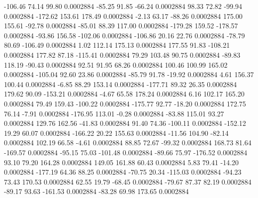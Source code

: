      -106.46       74.14       99.80     0.0002884
      -85.25       91.85      -66.24     0.0002884
       98.33       72.82      -99.94     0.0002884
     -172.62      153.61      178.49     0.0002884
       -2.13       63.17      -88.26     0.0002884
      175.00      155.61      -92.78     0.0002884
      -85.01       88.39      117.00     0.0002884
     -179.28      159.52     -178.57     0.0002884
      -93.86      156.58     -102.06     0.0002884
     -106.86       20.16       22.76     0.0002884
      -78.79       80.69     -106.49     0.0002884
        1.02      112.14      175.13     0.0002884
      177.55       91.83     -108.21     0.0002884
      177.82       87.18     -115.41     0.0002884
       79.29      103.48       90.75     0.0002884
      -89.83      118.19      -90.43     0.0002884
       92.51       91.95       68.26     0.0002884
      100.46      100.99      165.02     0.0002884
     -105.04       92.60       23.86     0.0002884
      -85.79       91.78      -19.92     0.0002884
        4.61      156.37      100.44     0.0002884
       -6.85       88.29      153.14     0.0002884
     -177.71       89.32       26.35     0.0002884
      179.62       90.09     -153.21     0.0002884
       -4.67       65.58      178.24     0.0002884
        6.16      102.17      165.20     0.0002884
       79.49      159.43     -100.22     0.0002884
     -175.77       92.77      -18.20     0.0002884
      172.75       76.14       -7.91     0.0002884
     -176.95      113.01       -0.28     0.0002884
      -83.88      115.01       93.27     0.0002884
      129.76      162.56      -41.83     0.0002884
       91.40       74.36     -100.11     0.0002884
     -152.12       19.29       60.07     0.0002884
     -166.22       20.22      155.63     0.0002884
      -11.56      104.90      -82.14     0.0002884
      102.19       66.58       -4.61     0.0002884
       88.85       72.67      -99.32     0.0002884
      168.73       81.64     -169.57     0.0002884
      -95.15       75.03     -101.48     0.0002884
      -89.66       75.97     -176.52     0.0002884
       93.10       79.20      164.28     0.0002884
      149.05      161.88       60.43     0.0002884
        5.83       79.41      -14.20     0.0002884
     -177.19       64.36       88.25     0.0002884
      -70.75       20.34     -115.03     0.0002884
      -94.23       73.43      170.53     0.0002884
       62.55       19.79      -68.45     0.0002884
      -79.67       87.37       82.19     0.0002884
      -89.17       93.63     -161.53     0.0002884
      -83.28       69.98      173.65     0.0002884

